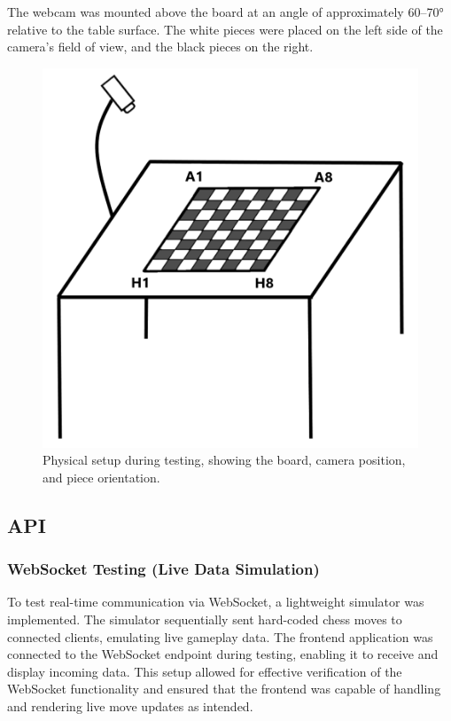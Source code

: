 The webcam was mounted above the board at an angle of approximately 60–70\si{\degree} relative to the table surface. The white pieces were placed on the left side of the camera's field of view, and the black pieces on the right.

\begin{figure}[h!]
    \centering
    \includegraphics[width=0.65\linewidth]{figures/methods/testing/setup.png}
    \caption[Setup during testing]{Physical setup during testing, showing the board, camera position, and piece orientation.}
    \label{fig:setup}
\end{figure}

\newpage



\subsection{API}
\label{subsec:api-methods}

\subsubsection*{WebSocket Testing (Live Data Simulation)}
\label{subsubsec:websocket-methods}

To test real-time communication via WebSocket, a lightweight simulator was implemented. The simulator sequentially sent hard-coded chess moves to connected clients, emulating live gameplay data. The frontend application was connected to the WebSocket endpoint during testing, enabling it to receive and display incoming data. This setup allowed for effective verification of the WebSocket functionality and ensured that the frontend was capable of handling and rendering live move updates as intended.

